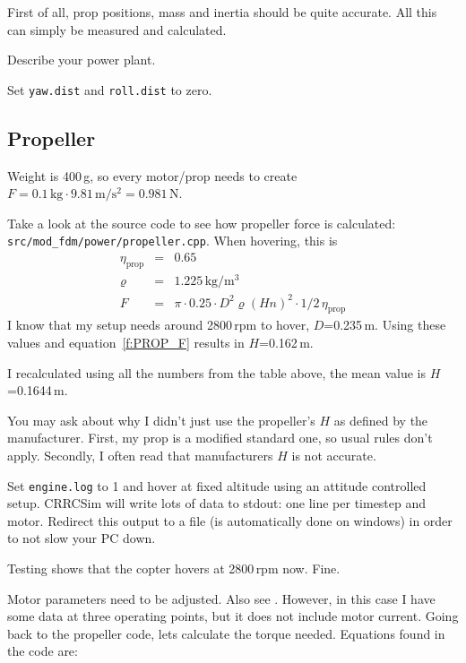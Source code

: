 \documentclass[a4paper, 11pt, pdftex]{article}
\newcommand{\unit}[1]{\textrm{#1}}
\newcommand{\EtaProp}{\eta_{\textrm{prop}}}
\begin{document}
    First of all, prop positions, mass and inertia should be quite accurate.
    All this can simply be measured and calculated.
    
    Describe your power plant.
    
    Set {\tt yaw.dist} and {\tt roll.dist} to zero.
    
    \subsection{Propeller}
    
    Weight is 400\,g, so every motor/prop needs to create
    $F = 0.1\,\unit{kg} \cdot 9.81\,\unit{m}/\unit{s}^2=0.981\,\unit{N}$.
    
    Take a look at the source code to see how propeller force is calculated:
    {\tt src/mod\_fdm/power/propeller.cpp}. When hovering, this is
    \begin{subequations}
    \begin{eqnarray}
      \EtaProp &=& 0.65\\
      \varrho &=& 1.225\,\unit{kg}/\unit{m}^3\\
      F &=& \pi \cdot 0.25 \cdot D^2 \varrho \left(H n\right)^2 \cdot 1/2\, \EtaProp \label{f:PROP_F}
    \end{eqnarray}
    \end{subequations}
    I know that my setup needs around 2800\,rpm to hover, $D$=0.235\,m.
    Using these values and equation~\eqref{f:PROP_F} results in $H$=0.162\,m.
    
    I recalculated using all the numbers from the table above, the mean
    value is $H$=0.1644\,m.
    
    You may ask about why I didn't just use the propeller's $H$ as defined by
    the manufacturer. First, my prop is a modified standard one, so usual
    rules don't apply. Secondly, I often read that manufacturers $H$ is not
    accurate.
    
    Set {\tt engine.log} to 1 and hover at fixed altitude using an attitude
    controlled setup. CRRCSim will write lots of data to stdout: one line
    per timestep and motor. Redirect this output to a file (is automatically
    done on windows) in order to not slow your PC down.
    
    Testing shows that the copter hovers at 2800\,rpm now. Fine.
    
    Motor parameters need to be adjusted. Also see \cite{l:C_POWER}. However,
    in this case I have some data at three operating points, but it does not
    include motor current. Going back to the propeller code, lets calculate
    the torque needed. Equations found in the code are:
\end{document}
